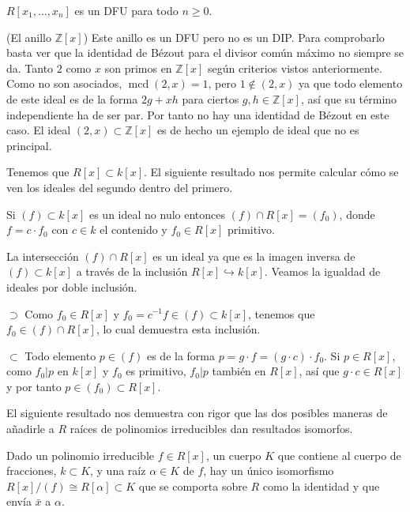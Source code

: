 
\(R[x_1,\dots, x_n]\) es un DFU para todo \(n\geq 0\). 

\textrm{\normalfont (El anillo $\mathbb Z[x]$)} Este
anillo es un DFU pero no es un DIP. Para comprobarlo basta ver que la
identidad de Bézout para el divisor común máximo no siempre se da. Tanto
\(2\) como \(x\) son primos en \(\mathbb Z[x]\) según criterios vistos
anteriormente. Como no son asociados, \(\operatorname{mcd}(2,x)=1\),
pero \(1\notin (2,x)\) ya que todo elemento de este ideal es de la forma
\(2g+xh\) para ciertos \(g,h\in \mathbb Z[x]\), así que su término
independiente ha de ser par. Por tanto no hay una identidad de Bézout en
este caso. El ideal \((2,x)\subset \mathbb Z[x]\) es de hecho un ejemplo
de ideal que no es principal. 

Tenemos que \(R[x]\subset k[x]\). El siguiente resultado nos permite
calcular cómo se ven los ideales del segundo dentro del primero.


Si \((f)\subset k[x]\) es un ideal no nulo entonces
\((f)\cap R[x]=(f_0)\), donde \(f=c\cdot f_0\) con \(c\in k\) el
contenido y \(f_0 \in R[x]\) primitivo. 


La intersección \((f)\cap R[x]\) es un ideal ya que es la imagen inversa
de \((f)\subset k[x]\) a través de la inclusión
\(R[x]\hookrightarrow k[x]\). Veamos la igualdad de ideales por doble
inclusión.

\(\supset\) Como \(f_0 \in R[x]\) y
\(f_0 =c^{-1}f \in (f)\subset k[x]\), tenemos que
\(f_0 \in (f)\cap R[x]\), lo cual demuestra esta inclusión.

\(\subset\) Todo elemento \(p \in (f)\) es de la forma
\(p =g\cdot f =(g \cdot c)\cdot f_0\). Si \(p \in R[x]\), como
\(f_0 |p\) en \(k[x]\) y \(f_0\) es primitivo, \(f_0 |p\) también en
\(R[x]\), así que \(g \cdot c\in R[x]\) y por tanto
\(p \in (f_0)\subset R[x]\). 

El siguiente resultado nos demuestra con rigor que las dos posibles
maneras de añadirle a \(R\) raíces de polinomios irreducibles dan
resultados isomorfos.


Dado un polinomio irreducible \(f\in R[x]\), un cuerpo \(K\) que
contiene al cuerpo de fracciones, \(k\subset K\), y una raíz
\(\alpha\in K\) de \(f\), hay un único isomorfismo
\(R[x]/(f)\cong R[\alpha]\subset K\) que se comporta sobre \(R\) como la
identidad y que envía \(\bar{x}\) a \(\alpha\). 

